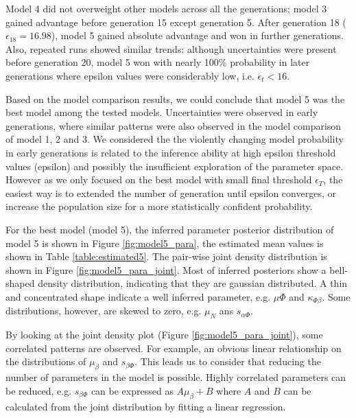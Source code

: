 Model 4 did not overweight other models across all the generations; model 3 gained advantage before generation 15 except generation 5. After generation 18 ($\epsilon_{18} = 16.98$), model 5 gained absolute advantage and won in further generations. Also, repeated runs showed similar trends: although uncertainties were present before generation 20, model 5 won with nearly 100\% probability in later generations where epsilon values were considerably low, i.e. $\epsilon_t<16$.

Based on the model comparison results, we could conclude that model 5 was the best model among the tested models. Uncertainties were observed in early generations, where similar patterns were also observed in the model comparison of model 1, 2 and 3. We considered the the violently changing model probability in early generations is related to the inference ability at high epsilon threshold values (epsilon) and possibly the insufficient exploration of the parameter space. However as we only focused on the best model with small final threshold $\epsilon_T$, the easiest way is to extended the number of generation until epsilon converges, or increase the population size for a more statistically confident probability.




For the best model (model 5), the inferred parameter posterior distribution of model 5 is shown in Figure \ref{fig:model5_para}, the estimated mean values is shown in Table \ref{table:estimated5}. The pair-wise joint density distribution is shown in Figure \ref{fig:model5_para_joint}. Most of inferred posteriors show a bell-shaped density distribution, indicating that they are gaussian distributed. A thin and concentrated shape indicate a well inferred parameter, e.g. $\mu{\Phi}$ and $\kappa_{\Phi\beta}$. Some distributions, however, are skewed to zero, e.g. $\mu_N$ ans $s_{\alpha\Phi}$.

By looking at the joint density plot (Figure \ref{fig:model5_para_joint}), some correlated patterns are observed. For example, an obvious linear relationship on the distributions of $\mu_\beta$ and $s_{\beta\Phi}$. This leads us to consider that reducing the number of parameters in the model is possible. Highly correlated parameters can be reduced, e.g. $s_{\beta\Phi}$ can be expressed as $A\mu_\beta+B$ where $A$ and $B$ can be calculated from the joint distribution by fitting a linear regression.

